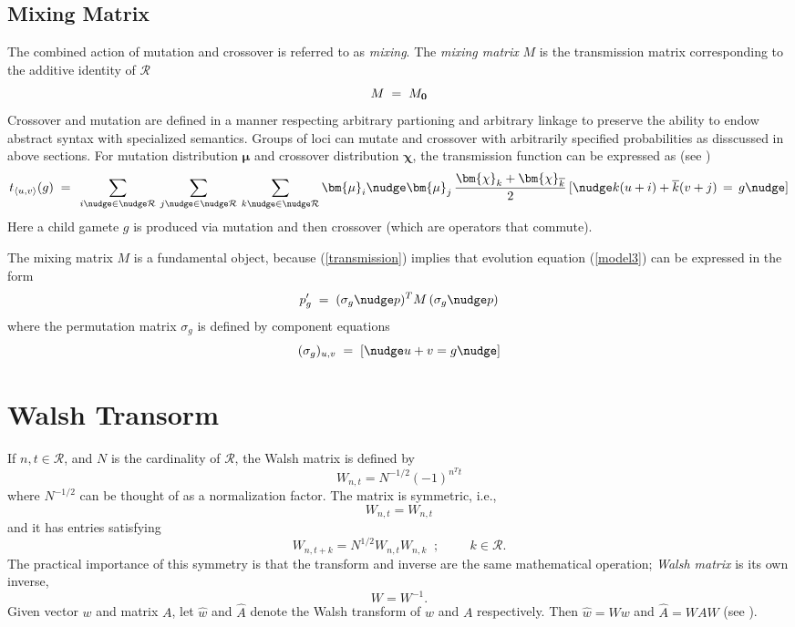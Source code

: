 \subsection{Mixing Matrix}
The combined action of mutation and crossover is referred to as {\em mixing}.
The {\em mixing matrix\/} $M$ is the transmission matrix corresponding to the 
additive identity of $\mathcal{R}$
\[
M \; = \; M_{\bf 0}\\[-0.01in]
\]
Crossover and mutation are defined in a manner respecting arbitrary partioning and 
arbitrary linkage to preserve the ability to endow abstract syntax with specialized 
semantics. Groups of loci can mutate and crossover with arbitrarily specified 
probabilities as disscussed in above sections. For mutation distribution $\bm{\mu}$ and 
crossover distribution $\bm{\chi}$, the transmission function can be expressed as (see \cite{VoseWright1998})
\begin{equation}
\label{transmission}
t_{\langle u,v \rangle}(g) \; = \;\,
\sum_{i \nudge \in \nudge \mathcal{R}} \, \sum_{j \nudge \in \nudge \mathcal{R}} \,
\sum_{k \nudge \in \nudge \mathcal{R}}
\bm{\mu}_i \nudge \bm{\mu}_j \, \frac{\bm{\chi}_k + \bm{\chi}_{\overline{k}}}{2} \,
[\nudge k (u + i) + \overline{k}(v + j) \, = \, g\nudge]
\end{equation}
Here a child gamete $g$ is produced via mutation and then crossover (which are operators that
commute). 

The mixing matrix $M$ is a fundamental object, because (\ref{transmission}) implies that 
evolution equation (\ref{model3}) can be expressed in the form
\begin{equation}
\label{model4}
p_g^\prime \; = \; (\sigma_g \nudge p)^T M \, (\sigma_g \nudge p)
\end{equation}
where the permutation matrix $\sigma_g$ is defined by component equations
\[
(\sigma_g)_{u,v} \; = \; [\nudge u+v = g\nudge ]
\]

\section{Walsh Transorm}
If $n, t \in \mathcal{R}$, and $N$ is the cardinality of $\mathcal{R}$, 
the Walsh matrix is defined by
\begin{equation}
\label{WalshT}
W_{n,t} = N^{-1/2} (-1)^{n^T t}
\end{equation}
where $N^{-1/2}$ can be thought of as a normalization factor.
The matrix is symmetric, i.e.,
\[
W_{n,t} = W_{n,t}
\]
and it has entries satisfying
\[
W_{n, t + k} = N^{1/2} W_{n, t} W_{n, k}  \;\;;  \hspace{1cm}  k \in \mathcal{R}.
\]
The practical importance of this symmetry is that the transform and inverse 
are the same mathematical operation; \textit{Walsh matrix} is its own inverse,
\[
W = W^{-1}.
\]
Given vector $w$ and matrix $A$, let $\widehat{w}$ and
$\widehat{A}$ denote the Walsh transform of $w$ and $A$ respectively. Then $\widehat{w} = Ww$ and
$\widehat{A} = WAW$ (see \cite{Beauchamp1975}).

